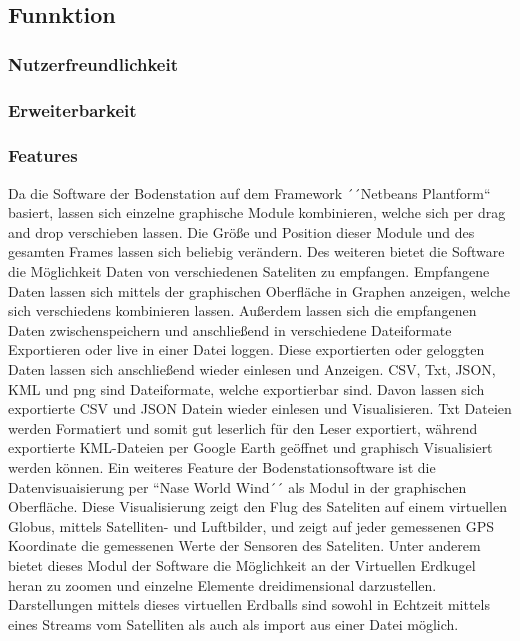 \subsection{Funnktion}
\subsubsection{Nutzerfreundlichkeit}



\subsubsection{Erweiterbarkeit}


\subsubsection{Features}
Da die Software der Bodenstation auf dem Framework ´´Netbeans Plantform`` basiert, lassen sich einzelne graphische Module kombinieren, welche sich per drag and drop verschieben lassen. Die Größe und Position dieser Module und des gesamten Frames lassen sich beliebig verändern. Des weiteren bietet die Software die Möglichkeit Daten von verschiedenen Sateliten zu empfangen. Empfangene Daten lassen sich mittels der graphischen Oberfläche in Graphen anzeigen, welche sich verschiedens kombinieren lassen. Außerdem lassen sich die empfangenen Daten zwischenspeichern und anschließend in verschiedene Dateiformate Exportieren oder live in einer Datei loggen. Diese exportierten oder geloggten Daten lassen sich anschließend wieder einlesen und Anzeigen. CSV, Txt, JSON, KML und png sind Dateiformate, welche exportierbar sind. Davon lassen sich exportierte CSV und JSON Datein wieder einlesen und Visualisieren. Txt Dateien werden Formatiert und somit gut leserlich für den Leser exportiert, während exportierte KML-Dateien per Google Earth geöffnet und graphisch Visualisiert werden können. Ein weiteres Feature der Bodenstationsoftware ist die Datenvisuaisierung per ``Nase World Wind´´ als Modul in der graphischen Oberfläche. Diese Visualisierung zeigt den Flug des Sateliten auf einem virtuellen Globus, mittels Satelliten- und Luftbilder, und zeigt auf jeder gemessenen GPS Koordinate die gemessenen Werte der Sensoren des Sateliten. Unter anderem bietet dieses Modul der Software die Möglichkeit an der Virtuellen Erdkugel heran zu zoomen und einzelne Elemente dreidimensional darzustellen. Darstellungen mittels dieses virtuellen Erdballs sind sowohl in Echtzeit mittels eines Streams vom Satelliten als auch als import aus einer Datei möglich.
